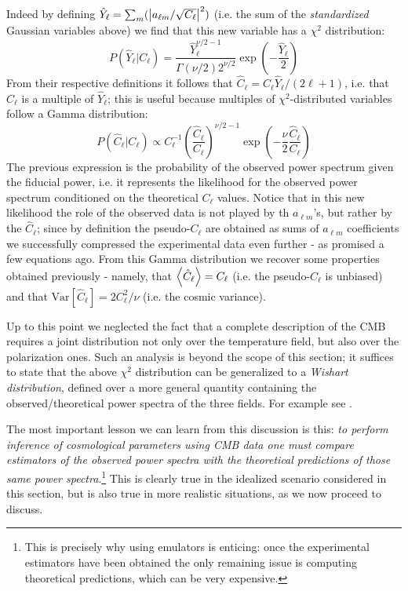 Indeed by defining $\hat{Y}_\ell = \sum_m (\abs{a_{\ell m}/\sqrt{C_\ell}}^2)$ (i.e. the sum of the \emph{standardized} Gaussian variables above) we find that this new variable has a $\chi^2$ distribution:
\begin{equation*}
    P(\hat{Y}_\ell|C_\ell) = \frac{\hat{Y}_\ell^{\nu/2-1}}{\Gamma(\nu/2)2^{\nu/2}}\exp \left(-\frac{\hat{Y}_\ell}{2}\right)
\end{equation*}
From their respective definitions it follows that $\hat{C}_\ell = C_\ell \hat{Y}_\ell / (2\ell+1)$, i.e. that $\hat{C}_\ell$ is a multiple of $\hat{Y}_\ell$; this is useful because multiples of $\chi^2$-distributed variables follow a Gamma distribution:
\begin{equation*}
    P(\hat{C}_\ell|C_\ell) \propto C_\ell^{-1} \left(\frac{\hat{C}_\ell}{C_\ell}\right)^{\nu/2 - 1}\exp \left(-\frac{\nu}{2}\frac{\hat{C}_\ell}{C_\ell}\right)
\end{equation*}
The previous expression is the probability of the observed power spectrum given the fiducial power, i.e. it represents the likelihood for the observed power spectrum conditioned on the theoretical $C_\ell$ values.
Notice that in this new likelihood the role of the observed data is not played by th $a_{\ell m}$'s, but rather by the $\hat{C}_\ell$; since by definition the pseudo-$C_\ell$ are obtained as sums of $a_{\ell m}$ coefficients we successfully compressed the experimental data even further - as promised a few equations ago.
From this Gamma distribution we recover some properties obtained previously - namely, that $\expval{\hat{C}_\ell} = C_\ell$ (i.e. the pseudo-$C_\ell$ is unbiased) and that $\mathrm{Var}[\hat{C}_\ell] = 2C_\ell^2/\nu$ (i.e. the cosmic variance).

Up to this point we neglected the fact that a complete description of the CMB requires a joint distribution not only over the temperature field, but also over the polarization ones. Such an analysis is beyond the scope of this section; it suffices to state that the above $\chi^2$ distribution can be generalized to a \emph{Wishart distribution}, defined over a more general quantity containing the observed/theoretical power spectra of the three fields. For example see \cite{likelihood_cmb}.

The most important lesson we can learn from this discussion is this: \emph{to perform inference of cosmological parameters using CMB data one must compare estimators of the observed power spectra with the theoretical predictions of those same power spectra}.\footnote{This is precisely why using emulators is enticing: once the experimental estimators have been obtained the only remaining issue is computing theoretical predictions, which can be very expensive.} This is clearly true in the idealized scenario considered in this section, but is also true in more realistic situations, as we now proceed to discuss.

